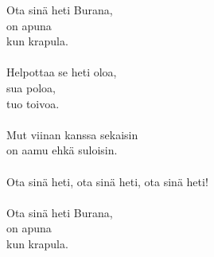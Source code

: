 
            Ota sinä heti Burana, \\
            on apuna \\
            kun krapula. \\
\hspace{10mm} \\
            Helpottaa se heti oloa, \\
            sua poloa, \\
            tuo toivoa. \\
\hspace{10mm} \\
            Mut viinan kanssa sekaisin \\
            on aamu ehkä suloisin. \\
\hspace{10mm} \\
            Ota sinä heti, ota sinä heti, ota sinä heti! \\
\hspace{10mm} \\
            Ota sinä heti Burana, \\
            on apuna \\
            kun krapula. \\

